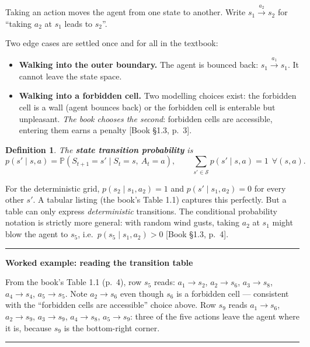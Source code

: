\documentclass[11pt, letterpaper]{article}
\theoremstyle{runin}
\newtheorem*{definition}{Definition}
\theoremstyle{runinplain}
\theoremstyle{remark}
\newcommand{\Prob}{\mathbb{P}}
\newcommand{\Sspace}{\mathcal{S}}
\newcommand{\bkin}[1]{{\color{bookblue}\small[\textsf{Book #1}]}}
\newenvironment{worked}[1]
  {\par\medskip\noindent\rule{\textwidth}{0.4pt}\par\nobreak\vspace{0.3em}
   \noindent\textbf{Worked example: #1}\par\nobreak\vspace{0.2em}\small}
  {\par\nobreak\vspace{0.3em}\noindent\rule{\textwidth}{0.4pt}\par\medskip}
\begin{document}
Taking an action moves the agent from one state to another. Write
$s_1 \xrightarrow{a_2} s_2$ for ``taking $a_2$ at $s_1$ leads to $s_2$''.

Two edge cases are settled once and for all in the textbook:

\begin{itemize}
  \item \textbf{Walking into the outer boundary.} The agent is bounced back:
        $s_1 \xrightarrow{a_1} s_1$. It cannot leave the state space.
  \item \textbf{Walking into a forbidden cell.} Two modelling choices exist: the
        forbidden cell is a wall (agent bounces back) or the forbidden cell is
        enterable but unpleasant. \emph{The book chooses the second}: forbidden
        cells are accessible, entering them earns a penalty
        \bkin{\S1.3, p.~3}.
\end{itemize}

\begin{definition}
The \textbf{state transition probability} is
\[
  p(s'\mid s,a) = \Prob(S_{t+1}=s' \mid S_t=s,\ A_t=a),
  \qquad \sum_{s'\in\Sspace} p(s'\mid s,a)=1 \ \ \forall (s,a).
\]
\end{definition}

For the deterministic grid, $p(s_2\mid s_1,a_2)=1$ and $p(s'\mid s_1,a_2)=0$ for
every other $s'$. A tabular listing (the book's Table 1.1) captures this perfectly.
But a table can only express \emph{deterministic} transitions. The conditional
probability notation is strictly more general: with random wind gusts, taking $a_2$
at $s_1$ might blow the agent to $s_5$, i.e.\ $p(s_5\mid s_1,a_2)>0$
\bkin{\S1.3, p.~4}.

\begin{worked}{reading the transition table}
From the book's Table 1.1 (p.~4), row $s_5$ reads: $a_1\to s_2$, $a_2\to s_6$,
$a_3\to s_8$, $a_4\to s_4$, $a_5\to s_5$. Note $a_2\to s_6$ even though $s_6$ is a
forbidden cell --- consistent with the ``forbidden cells are accessible'' choice
above. Row $s_9$ reads $a_1\to s_6$, $a_2\to s_9$, $a_3\to s_9$, $a_4\to s_8$,
$a_5\to s_9$: three of the five actions leave the agent where it is, because $s_9$
is the bottom-right corner.
\end{worked}
\end{document}

